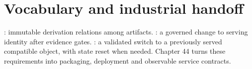 \section{Vocabulary and industrial handoff}
: immutable derivation relations among artifacts.
: a governed change to serving identity after evidence gates.
: a validated switch to a previously served compatible object,
with state reset when needed. Chapter 44 turns these requirements into
packaging, deployment and observable service contracts.
